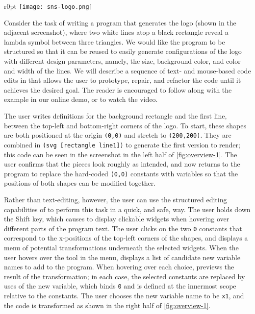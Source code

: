 %
\setlength{\intextsep}{6pt}%
\setlength{\columnsep}{10pt}%
\begin{wrapfigure}{r}{0pt}
\texttt{[image: sns-logo.png]}
\end{wrapfigure}
%
Consider the task of writing a program that generates the \sns{} logo
(shown in the adjacent screenshot), where two white lines
atop a black rectangle reveal a lambda symbol between three triangles.
We would like the program to be structured so that it can be reused
to easily generate configurations of the logo with different design parameters,
namely, the size, background color, and color and width of the
lines. We will describe a sequence of text- and mouse-based code
edits in \deuce{} that allows the user to
prototype, repair, and refactor the code until it achieves
the desired goal. The reader is encouraged to follow along with
the example in our online demo, or to watch the
video.


The user writes definitions for the background rectangle and the first line,
between the top-left and bottom-right corners of the logo.
To start, these shapes are both
positioned at the origin \verb+(0,0)+ and stretch to
\verb+(200,200)+. They are combined in
\verb+(svg [rectangle line1])+ to generate the first version to
render; this code can be seen in the screenshot in the left half
of \autoref{fig:overview-1}.
The user confirms that the pieces look roughly as intended, and
now returns to the program to replace the hard-coded \verb+(0,0)+
constants with variables so that the positions of both shapes can be
modified together.

Rather than text-editing, however, the
user can use the structured editing capabilities of \deuce{} to
perform this task in a quick, and safe, way.
The user holds down the Shift key, which causes \deuce{} to display
clickable widgets when hovering over different parts of the program
text. The user clicks on the two \verb+0+ constants that correspond to
the x-positions of the top-left corners of the shapes, and \deuce{}
displays a menu of potential transformations underneath the selected
widgets. When the user hovers over the  tool in the menu,
\deuce{} displays a list of candidate new variable names to add to the
program. When hovering over each choice, \deuce{} previews the result
of the transformation; in each case, the selected constants are replaced by
uses of the new variable, which binds \verb+0+ and is defined at the
innermost scope relative to the constants.
The user chooses the new variable name to be \verb+x1+, and
the code is transformed as shown in the right half of
\autoref{fig:overview-1}.

